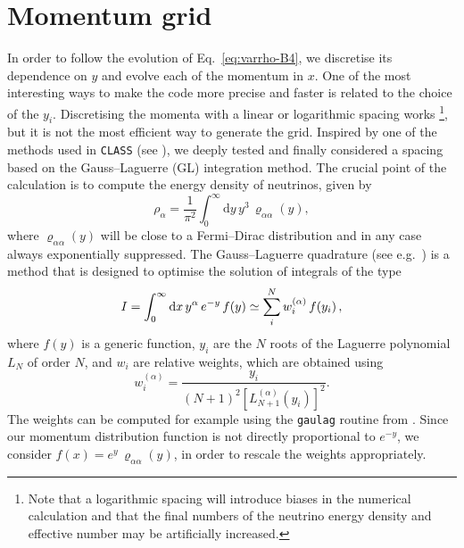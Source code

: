 \documentclass[notitlepage,showpacs,preprintnumbers,amsmath,amssymb,superscriptaddress,prd,onecolumn]{revtex4-1}
\begin{document}
\section{Momentum grid}
\label{ssec:momenta}
In order to follow the evolution of Eq.~\eqref{eq:varrho-B4}, we discretise its dependence on $y$ and evolve each of the momentum in $x$.
One of the most interesting ways to make the code more precise and faster is related to the choice of the $y_i$.
Discretising the momenta with a linear or logarithmic spacing works%
\footnote{Note that a logarithmic spacing will introduce biases in the numerical calculation
and that the final numbers of
the neutrino energy density and effective number may be artificially increased.},
but it is not the most efficient way to generate the grid.
Inspired by one of the methods used in \texttt{CLASS} (see \cite{Lesgourgues:2011rh}),
we deeply tested and finally considered a spacing based on the Gauss--Laguerre (GL) integration method.
The crucial point of the calculation is to compute the energy density of neutrinos,
given by
%
\begin{equation}
\rho_\alpha
=
\frac{1}{\pi^2}
\int_0^\infty
\mathrm{d}y\, y^3\,\varrho_{\alpha\alpha}(y),
\end{equation}
%
where $\varrho_{\alpha\alpha}(y)$ will be close to a Fermi--Dirac distribution and in any case always exponentially suppressed.
The Gauss--Laguerre quadrature (see e.g.~\cite{NR})
is a method that is designed to optimise the solution of integrals of the type
\begin{equation}
I
=
\int_0^\infty
{\rm d}x\, y^\alpha\,e^{-y}\,f(y)
\simeq\sum_i^{N}w_i^{(\alpha)}\,f(y_i)
\,,
\end{equation}
where $f(y)$ is a generic function,
$y_i$ are the $N$ roots of the Laguerre polynomial $L_N$ of order $N$, and $w_i$ are relative weights,
 which are obtained using
\begin{equation}
w_i^{(\alpha)}=
\frac{y_i}{\left(N+1\right)^2\left[L^{(\alpha)}_{N+1}(y_i)\right]^2}.
\end{equation}
The weights can be computed for example using the \texttt{gaulag} routine from \cite{NR}.
Since our momentum distribution function is not directly proportional to $e^{-y}$,
we consider $f(x)=e^y\,\varrho_{\alpha\alpha}(y)$,
in order to rescale the weights appropriately.
\end{document}
